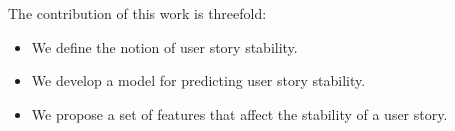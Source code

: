 










The contribution of this work is threefold:
\begin{itemize}
    \item We define the notion of user story stability.
    
    \item We develop a model for predicting user story stability.%
    \item We propose a set of features that affect the stability of a user story.
\end{itemize}


